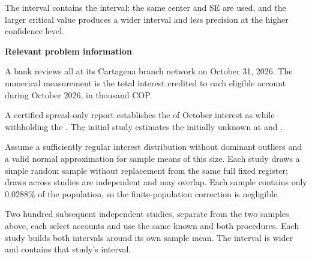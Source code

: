 The  interval contains the  interval: the same center and SE are used, and the larger critical value produces a wider interval and less precision at the higher confidence level.

\secInicio[][sec:p2]

\clearpage



\textbf{Relevant problem information}

\begin{probleminfoexcerpt}
A bank reviews all      at its Cartagena branch network on October 31, 2026. The numerical measurement is the total interest credited to each eligible account during October 2026, in thousand COP.
\end{probleminfoexcerpt}

\begin{probleminfoexcerpt}
A certified spread-only report establishes the    of October interest as    while withholding the  . The initial study estimates the initially unknown   at  and  .
\end{probleminfoexcerpt}

\begin{probleminfoexcerpt}
Assume a sufficiently regular interest distribution without dominant outliers and a valid normal approximation for sample means of this size. Each study draws a simple random sample without replacement from the same full fixed register; draws across studies are independent and may overlap. Each sample contains only 0.0288\% of the population, so the finite-population correction is negligible.
\end{probleminfoexcerpt}

\begin{probleminfoexcerpt}
Two hundred subsequent independent studies, separate from the two samples above, each select  accounts and use the same known    and both  procedures. Each study builds both intervals around its own sample mean. The  interval is wider and contains that study's  interval.
\end{probleminfoexcerpt}

